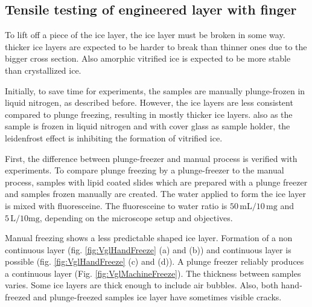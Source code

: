\subsection{Tensile testing of engineered layer with finger}

To lift off a piece of the ice layer, the ice layer must be broken in some way. thicker ice layers are expected to be harder to break than thinner ones due to the bigger cross section. Also amorphic vitrified ice is expected to be more stable than crystallized ice.

Initially, to save time for experiments, the samples are manually plunge-frozen in liquid nitrogen, as described before. However, the ice layers are less consistent compared to plunge freezing, resulting in mostly thicker ice layers. also as the sample is frozen in liquid nitrogen and with cover glass as sample holder, the leidenfrost effect is inhibiting the formation of vitrified ice.


First, the difference between plunge-freezer and manual process is verified with experiments. To compare plunge freezing by a plunge-freezer to the manual process, samples with lipid coated slides which are prepared with a plunge freezer and samples frozen manually are created. The water applied to form the ice layer is mixed with fluoresceine. The fluoresceine to water ratio is $50\,\si{\milli\liter}/10\,\si{\milli\gram}$ and $5\,\si{\liter}/10\si{\milli\gram}$, depending on the microscope setup and objectives.

Manual freezing shows a less predictable shaped ice layer. Formation of a non continuous layer (fig. \ref{fig:VglHandFreeze} (a) and (b))  and continuous layer is possible (fig. \ref{fig:VglHandFreeze} (c) and (d)). A plunge freezer reliably produces a continuous layer (Fig. \ref{fig:VglMachineFreeze}). The thickness between samples varies. Some ice layers are thick enough to include air bubbles. Also, both hand-freezed and plunge-freezed samples ice layer have sometimes visible cracks.

